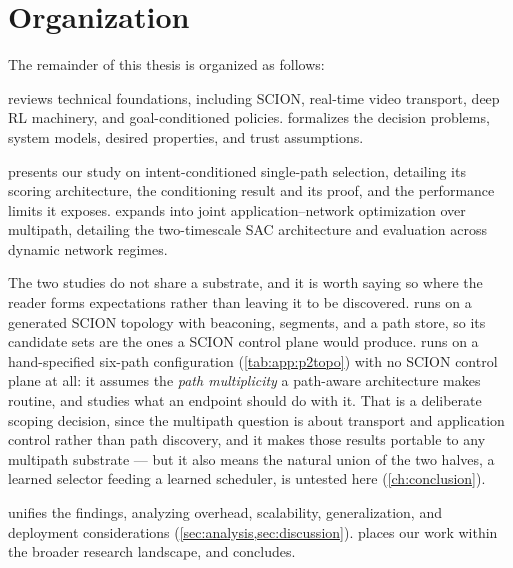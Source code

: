\section{Organization}
\label{sec:intro:organization}

The remainder of this thesis is organized as follows:

 reviews technical foundations, including SCION, real-time video transport, deep RL machinery, and goal-conditioned policies.
 formalizes the decision problems, system models, desired properties, and trust assumptions.

 presents our study on intent-conditioned single-path selection, detailing its scoring architecture, the conditioning result and its proof, and the performance limits it exposes.
 expands into joint application--network optimization over multipath, detailing the two-timescale SAC architecture and evaluation across dynamic network regimes.

The two studies do not share a substrate, and it is worth saying so where the reader forms expectations
rather than leaving it to be discovered.  runs on a generated SCION topology with
beaconing, segments, and a path store, so its candidate sets are the ones a SCION control plane would
produce.  runs on a hand-specified six-path configuration
(\cref{tab:app:p2topo}) with no SCION control plane at all: it assumes the \emph{path multiplicity} a
path-aware architecture makes routine, and studies what an endpoint should do with it. That is a
deliberate scoping decision, since the multipath question is about transport and application control
rather than path discovery, and it makes those results portable to any multipath substrate --- but it
also means the natural union of the two halves, a learned selector feeding a learned scheduler, is
untested here (\cref{ch:conclusion}).

 unifies the findings, analyzing overhead, scalability, generalization, and deployment considerations (\cref{sec:analysis,sec:discussion}).
 places our work within the broader research landscape, and  concludes.